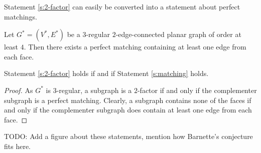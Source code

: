 Statement \ref{s:2-factor} can easily be converted into a statement about perfect matchings.

\begin{guess} \label{s:matching}
  Let $G^* = (V^*, E^*)$ be a $3$-regular $2$-edge-connected planar graph of order at least $4$.
  Then there exists a perfect matching containing at least one edge from each face.
\end{guess}
\begin{claim}
  Statement \ref{s:2-factor} holds if and if Statement \ref{s:matching} holds.
\end{claim}
\begin{proof}
  As $G^*$ is $3$-regular, a subgraph is a $2$-factor if and only if the complementer
  subgraph is a perfect matching. Clearly, a subgraph contains none of the faces
  if and only if the complementer subgraph does contain at least one edge from
  each face.
\end{proof}

TODO: Add a figure about these statements, mention how Barnette's conjecture fits
here.
